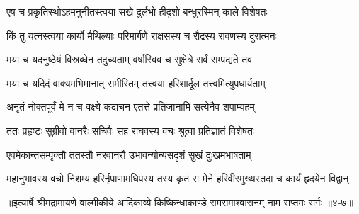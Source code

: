 \twolineshloka
{एष च प्रकृतिस्थोऽहमनुनीतस्त्वया सखे}
{दुर्लभो हीदृशो बन्धुरस्मिन् काले विशेषतः} %

\twolineshloka
{किं तु यत्नस्त्वया कार्यो मैथिल्याः परिमार्गणे}
{राक्षसस्य च रौद्रस्य रावणस्य दुरात्मनः} %

\twolineshloka
{मया च यदनुष्ठेयं विस्रब्धेन तदुच्यताम्}
{वर्षास्विव च सुक्षेत्रे सर्वं सम्पद्यते तव} %

\twolineshloka
{मया च यदिदं वाक्यमभिमानात् समीरितम्}
{तत्त्वया हरिशार्दूल तत्त्वमित्युपधार्यताम्} %

\twolineshloka
{अनृतं नोक्तपूर्वं मे न च वक्ष्ये कदाचन}
{एतत्ते प्रतिजानामि सत्येनैव शपाम्यहम्} %

\twolineshloka
{ततः प्रहृष्टः सुग्रीवो वानरैः सचिवैः सह}
{राघवस्य वचः श्रुत्वा प्रतिज्ञातं विशेषतः} %

\twolineshloka
{एवमेकान्तसम्पृक्तौ ततस्तौ नरवानरौ}
{उभावन्योन्यसदृशं सुखं दुःखमभाषताम्} %

\twolineshloka
{महानुभावस्य वचो निशम्य हरिर्नृपाणामधिपस्य तस्य}
{कृतं स मेने हरिवीरमुख्यस्तदा च कार्यं हृदयेन विद्वान्} %


॥इत्यार्षे श्रीमद्रामायणे वाल्मीकीये आदिकाव्ये किष्किन्धाकाण्डे रामसमाश्वासनम् नाम सप्तमः सर्गः ॥४-७॥
